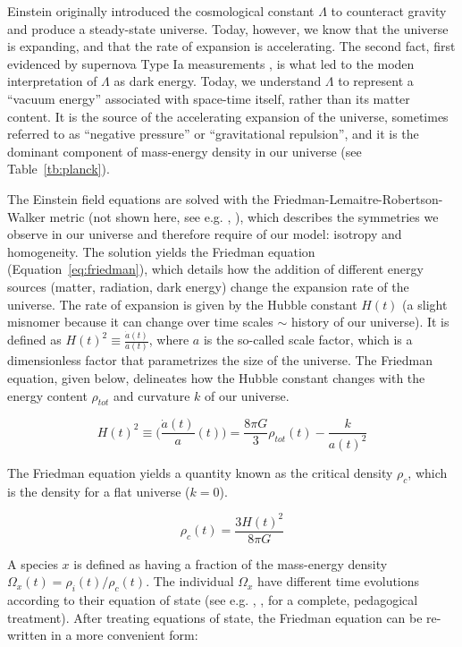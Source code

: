 Einstein originally introduced the cosmological constant $\Lambda$ to counteract gravity and produce a steady-state universe. Today, however, we know that the universe is expanding, and that the rate of expansion is accelerating. The second fact, first evidenced by supernova Type Ia measurements \cite{Riess1998} \cite{Perlmutter1998}, is what led to the moden interpretation of $\Lambda$ as dark energy. Today, we understand  $\Lambda$ to represent a ``vacuum energy'' associated with space-time itself, rather than its matter content. It is the source of the accelerating expansion of the universe, sometimes referred to as ``negative pressure'' or ``gravitational repulsion'', and it is the dominant component of mass-energy density in our universe (see Table~\ref{tb:planck}).

The Einstein field equations are solved with the Friedman-Lemaitre-Robertson-Walker metric (not shown here, see e.g. \cite{Ryden2006}, \cite{Kolb1990}), which describes the symmetries we observe in our universe and therefore require of our model: isotropy and homogeneity. The solution yields the Friedman equation (Equation~\ref{eq:friedman}), which details how the addition of different energy sources (matter, radiation, dark energy) change the expansion rate of the universe. The rate of expansion is given by the Hubble constant $H(t)$ (a slight misnomer because it can change over time scales $\sim$ history of our universe). It is defined as $H(t)^{2} \equiv \frac{\dot{a}(t)}{a(t)}$, where $a$ is the so-called scale factor, which is a dimensionless factor that parametrizes the size of the universe. The Friedman equation, given below, delineates how the Hubble constant changes with the energy content $\rho_{tot}$ and curvature $k$ of our universe.

\begin{equation}
\label{eq:friedman}
H(t)^{2} \equiv \Big( \frac{\dot{a}(t)}{a}(t) \Big) = \frac{8 \pi G}{3} \rho_{tot}(t) - \frac{k}{a(t)^{2}}
\end{equation}

The Friedman equation yields a quantity known as the critical density $\rho_{c}$, which is the density for a flat universe ($k=0$). 

\begin{equation}
\rho_{c}(t) = \frac{ 3 H(t)^{2}}{8 \pi G} 
\end{equation}

A species $x$ is defined as having a fraction of the mass-energy density $\Omega_{x}(t) = \rho_{i}(t) / \rho_{c}(t)$. The individual $\Omega_{x}$ have different time evolutions according to their equation of state (see e.g. \cite{Ryden2006}, \cite{Kolb1990}, for a complete, pedagogical treatment). After treating equations of state, the Friedman equation can be re-written in a more convenient form: 

